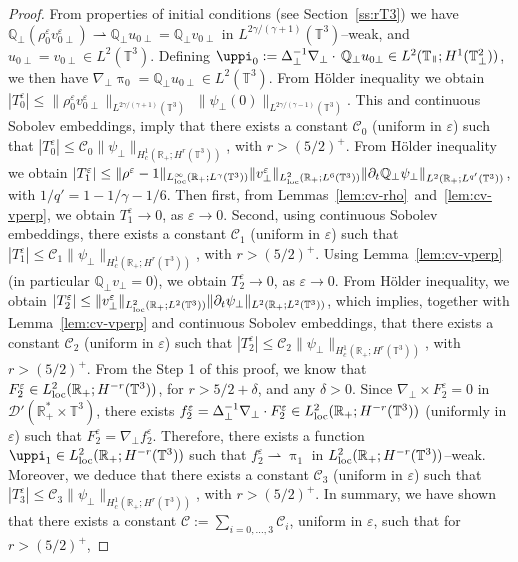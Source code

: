 \documentclass[11pt,reqno]{amsart}
\def \R{{\mathbb{R}}}
\def \Q{{\mathbb{Q}}}
\def \T{{\mathbb{T}}}
\newcommand{\myparallel}{{\mkern3mu\vphantom{\perp}\vrule depth 0pt\mkern2mu\vrule depth 0pt\mkern3mu}}
\begin{document}
\begin{proof}
From properties of initial conditions (see Section~\ref{ss:rT3})  we have $\Q_\perp(\rho_0^\varepsilon v_{0\perp}^\varepsilon)  \rightharpoonup \Q_\perp u_{0\perp} = \Q_\perp v_{0\perp}$ in $ L^{2\gamma/(\gamma+1)}(\T^3)$--weak, and $u_{0\perp}=v_{0\perp} \in L^2(\T^3)$. Defining $\uppi_0 := \Delta_\perp^{-1} \nabla_\perp\cdot\, \Q_\perp u_{0 \perp} \in L^2(\T_\myparallel; H^1(\T_\perp^2))$, we then have $\nabla_\perp \uppi_0= \Q_\perp u_{0\perp} \in L^2(\T^3)$. From  H\"older inequality we obtain  $|T_0^\varepsilon| \leq \| \rho_0^\varepsilon v_{0\perp}^\varepsilon\|_{L^{2\gamma/(\gamma+1)}(\T^3)} \!\! $ $ \|  \psi_\perp(0)\|_{L^{2\gamma/(\gamma-1)}(\T^3)}$. This and continuous Sobolev embeddings, imply that there exists a constant $\mathcal C_0$ (uniform in $\varepsilon$) such that $|T_0^\varepsilon| \leq \mathcal C_0 \|\psi_\perp\|_{H_c^1(\R_+; H^r(\T^3))}$, with $r>(5/2)^+$. From H\"older inequality we obtain $|T_1^\varepsilon|\leq \|\rho^\varepsilon -1 \|_{L_{\rm loc}^\infty(\R_+;L^\gamma(\T^3))} \|v_\perp^\varepsilon\|_{L_{\rm loc}^2(\R_+;L^6(\T^3))} \| \partial_t\Q_\perp \psi_\perp\|_{L^2(\R_+;L^{q'}(\T^3))}$, with $1/q'=1-1/\gamma -1/6$. Then first, from Lemmas~\ref{lem:cv-rho}~and~\ref{lem:cv-vperp}, we obtain $T_1^\varepsilon\rightarrow 0$, as $\varepsilon \rightarrow 0$. Second, using  continuous Sobolev embeddings, there exists a constant $\mathcal C_1$ (uniform in $\varepsilon$) such that $|T_1^\varepsilon| \leq \mathcal C_1 \|\psi_\perp\|_{H_c^1(\R_+; H^r(\T^3))}$, with $r>(5/2)^+$.  Using Lemma~\ref{lem:cv-vperp} (in particular $\Q_\perp v_\perp=0$), we obtain $T_2^\varepsilon\rightarrow 0$, as $\varepsilon \rightarrow 0$. From H\"older inequality, we obtain  $ |T_2^\varepsilon|\leq \|v_\perp^\varepsilon\|_{L_{\rm loc}^2(\R_+;L^2(\T^3))} \| \partial_t \psi_\perp\|_{L^2(\R_+;L^{2}(\T^3))}$,  which implies, together with  Lemma~\ref{lem:cv-vperp} and  continuous Sobolev embeddings, that there exists a constant $\mathcal C_2$ (uniform in $\varepsilon$) such that $|T_2^\varepsilon| \leq \mathcal C_2 \|\psi_\perp\|_{H_c^1(\R_+; H^r(\T^3))}$, with $r>(5/2)^+$. From the Step 1 of this proof, we know that $F_2^\varepsilon \in L_{\rm loc}^{2}(\R_+; H^{-r}(\T^3))$, for $r>5/2+\delta $, and any $\delta >0$. Since $\nabla_\perp \times F_2^\varepsilon=0$ in $\mathcal D'(\R_+^*\times \T^3)$, there exists $f_2^\varepsilon = \Delta_\perp^{-1}\nabla_\perp \cdot F_2^\varepsilon \in  L_{\rm loc}^{2}(\R_+; H^{-r}(\T^3)) $   (uniformly in  $\varepsilon$) such that $F_2^\varepsilon=\nabla_\perp f_2^\varepsilon$. Therefore, there exists a function $\uppi_1 \in  L_{\rm loc}^{2}(\R_+; H^{-r}(\T^3)) $ such that $f_2^\varepsilon \rightharpoonup \uppi_1 $ in $ L_{\rm loc}^{2}(\R_+; H^{-r}(\T^3))$--weak. Moreover, we deduce that there exists a constant $\mathcal C_3$ (uniform in $\varepsilon$) such that $|T_3^\varepsilon| \leq \mathcal C_3 \|\psi_\perp\|_{H_c^1(\R_+; H^r(\T^3))}$, with $r>(5/2)^+$. In summary, we have shown that there exists a constant $\mathcal C:=\sum_{i=0,\ldots,3}\mathcal C_i$, uniform in $\varepsilon$, such that for $r>(5/2)^+$,

\end{proof}
\end{document}
